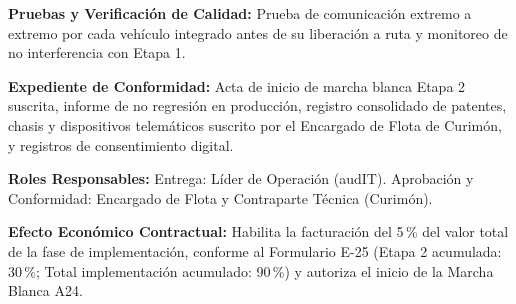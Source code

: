 \par\noindent\textbf{Pruebas y Verificación de Calidad:} Prueba de comunicación extremo a extremo por cada vehículo integrado antes de su liberación a ruta y monitoreo de no interferencia con Etapa 1.\par
\par\noindent\textbf{Expediente de Conformidad:} Acta de inicio de marcha blanca Etapa 2 suscrita, informe de no regresión en producción, registro consolidado de patentes, chasis y dispositivos telemáticos suscrito por el Encargado de Flota de Curimón, y registros de consentimiento digital.\par
\par\noindent\textbf{Roles Responsables:} Entrega: Líder de Operación (audIT). Aprobación y Conformidad: Encargado de Flota y Contraparte Técnica (Curimón).\par
\par\noindent\textbf{Efecto Económico Contractual:} Habilita la facturación del 5\,\% del valor total de la fase de implementación, conforme al Formulario E-25 (Etapa 2 acumulada: 30\,\%; Total implementación acumulado: 90\,\%) y autoriza el inicio de la Marcha Blanca A24.\par

